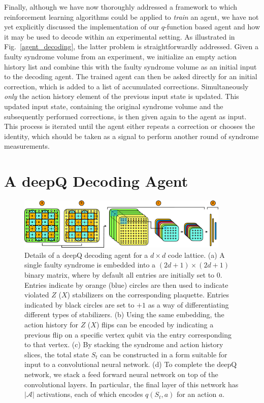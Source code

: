\documentclass[twocolumn,preprintnumbers,amsmath,amssymb,notitlepage,nofootinbib,longbibliography,superscriptaddress,aps,pra,10pt]{revtex4-1}
\begin{document}
	Finally, although we have now thoroughly addressed a framework to which reinforcement learning algorithms could be applied to \textit{train} an agent, we have not yet explicitly discussed the implementation of our $q$-function based agent and how it may be used to decode within an experimental setting.
	As illustrated in Fig.~\ref{agent_decoding}, the latter problem is straightforwardly addressed.
	Given a faulty syndrome volume from an experiment, we initialize an empty action history list and combine this with the faulty syndrome volume as an initial input to the decoding agent.
	The trained agent can then be asked directly for an initial correction, which is added to a list of accumulated corrections.
	Simultaneously \textit{only} the action history element of the previous input state is updated.
	This updated input state, containing the original syndrome volume and the subsequently performed corrections, is then given again to the agent as input.
	This process is iterated until the agent either repeats a correction or chooses the identity, which should be taken as a signal to perform another round of syndrome measurements.

\section{A deepQ Decoding Agent}\label{s:dq_agent}

	\begin{figure}
		\centering
		\includegraphics[width=0.9\textwidth]{figures/agent.pdf}
		\caption{
			Details of a deepQ decoding agent for a $d\times d$ code lattice.
			(a) A single faulty syndrome is embedded into a $(2d +1)\times(2d+1)$ binary matrix, where by default all entries are initially set to $0$.
			Entries indicate by orange (blue) circles are then used to indicate violated $Z$ ($X$) stabilizers on the corresponding plaquette.
			Entries indicated by black circles are set to $+1$ as a way of differentiating different types of stabilizers.
			(b) Using the same embedding, the action history for $Z$ ($X$) flips can be encoded by indicating a previous flip on a specific vertex qubit via the entry corresponding to that vertex.
			(c) By stacking the syndrome and action history slices, the total state $S_t$ can be constructed in a form suitable for input to a convolutional neural network.
			(d) To complete the deepQ network, we stack a feed forward neural network on top of the convolutional layers.
			In particular, the final layer of this network has $|\mathcal{A}|$ activations, each of which encodes $q(S_t,a)$ for an action $a$.
		}
		\label{f:agent}
	\end{figure}
\end{document}

